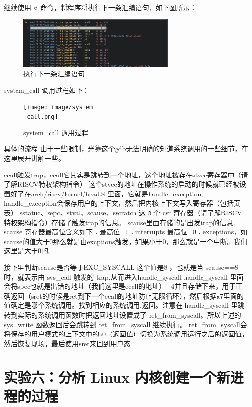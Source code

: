 \documentclass[lang=cn,10pt]{elegantbook}
\begin{document}
继续使用 si 命令，将程序将执行下一条汇编语句，如下图所示：
\begin{figure}[htbp]
  \centering
  \includegraphics[width=0.7\textwidth]{image/image-20231106163210213.png}
  \caption{执行下一条汇编语句}
\end{figure}

system\_call 调用过程如下：
\begin{figure}[htbp]
  \centering
  \texttt{[image: image/system\\\_call.png]}
  \caption{system\_call 调用过程}
\end{figure}

\newpage
具体的流程
由于一些限制，光靠这个gdb无法明确的知道系统调用的一些细节，在这里展开讲解一些。

ecall触发trap，ecall它其实是跳转到一个地址，这个地址被存在stvec寄存器中（请了解RISCV特权架构指令）
这个stvec的地址在操作系统的启动的时候就已经被设置好了在arch/riscv/kernel/head.S 里面，它就是handle\_exception。
handle\_execption会保存用户的上下文，然后把内核上下文写入寄存器（包括页表）
sstatuc、sepc、stval、scause、sscratch 这 5 个 csr 寄存器（请了解RISCV特权架构指令）存储了触发trap的信息。
scause里面存储的是出发trap的信息，scause 寄存器最高位含义如下：最高位=1：interrupts 最高位=0：exceptions，如scause的值大于0那么就是由excptions触发，如果小于0，那么就是一个中断。我们这里是大于0的。

接下里判断scause是否等于EXC\_SYSCALL 这个值是8 ，也就是当 scause==8 时，就表示由 sys\_call 触发的 trap,从而进入handle\_syscall
handle\_syscall 里面会将spec也就是出错的地址（我们这里是ecall的地址）+4并且存储下来，用于正确返回（sret的时候是ret到下一个ecall的地址防止无限循环），然后根据a7里面的值确定是哪个系统调用。找到相应的系统调用,返回。注意在 handle\_syscall 里跳转到实际的系统调用函数时把返回地址设置成了 ret\_from\_syscall。所以上述的 sys\_write 函数返回后会跳转到 ret\_from\_syscall 继续执行。
ret\_from\_syscall会将保存的用户模式的上下文中的a0（返回值）切换为系统调用运行之后的返回值，然后恢复现场，最后使用sret来回到用户态


\chapter{实验六：分析 Linux 内核创建一个新进程的过程}
\end{document}
